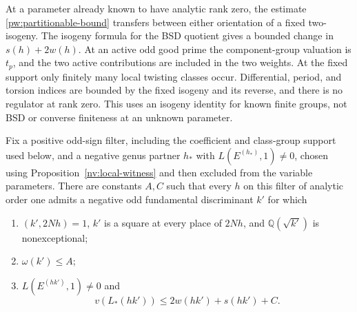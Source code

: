 At a parameter already known to have analytic rank zero, the estimate
\eqref{pw:partitionable-bound} transfers between either orientation of a
fixed two-isogeny.  The isogeny formula for the BSD quotient gives a bounded
change in $s(h)+2w(h)$.  At an active odd good prime the component-group
valuation is $t_p$, and the two active contributions are included in the
two weights.  At the fixed support only finitely many local twisting
classes occur.  Differential, period, and torsion indices are bounded by
the fixed isogeny and its reverse, and there is no regulator at rank zero.
This uses an isogeny identity for known finite groups, not BSD or converse
finiteness at an unknown parameter.

\begin{lemma}
\label{pw:rough-companion}
Fix a positive odd-sign filter, including the coefficient and class-group
support used below, and a negative genus partner $h_*$ with
$L(E^{(h_*)},1)\ne0$, chosen using Proposition~\ref{nv:local-witness} and then
excluded from the variable parameters.  There are constants $A,C$ such
that every $h$ on this filter of analytic order one admits a negative odd
fundamental discriminant $k'$ for which
\begin{enumerate}
\item $(k',2Nh)=1$, $k'$ is a square at every place of $2Nh$, and
$\mathbb Q(\sqrt{k'})$ is nonexceptional;
\item $\omega(k')\le A$;
\item $L(E^{(hk')},1)\ne0$ and
\begin{equation}\label{pw:rough-bound}
 v(L_*(hk'))\le 2w(hk')+s(hk')+C.
\end{equation}
\end{enumerate}
\end{lemma}

